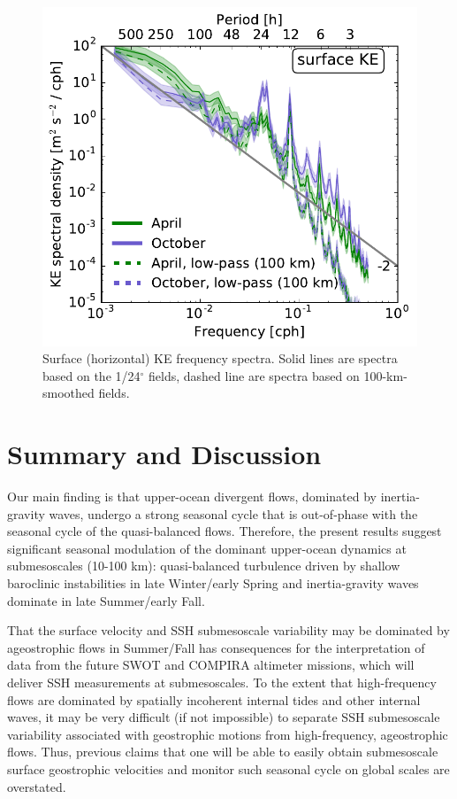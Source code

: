\documentclass[grl]{agutex2015}
\begin{document}
\begin{article}
\begin{figure}[ht]
  \begin{center}
    \includegraphics[width=.45\textwidth]{figs/fig4.pdf}
 \caption{Surface (horizontal) KE frequency spectra. Solid lines
 are spectra based on the 1/24$^\circ$ fields, dashed line are spectra
 based on 100-km-smoothed fields.}
 \label{fig4}
 \end{center}
\end{figure}



\section{Summary and Discussion}
Our main finding is that
upper-ocean divergent flows, dominated by inertia-gravity waves, undergo
a strong seasonal cycle that is out-of-phase with the seasonal cycle of
the quasi-balanced flows. Therefore, the present results suggest significant
seasonal modulation of the dominant upper-ocean dynamics at submesoscales
(10-100 km): quasi-balanced turbulence driven by shallow baroclinic instabilities
in late Winter/early Spring
and inertia-gravity waves dominate in late Summer/early Fall.

That the  surface velocity and SSH submesoscale variability may be
dominated by ageostrophic flows in
Summer/Fall has consequences for the interpretation of data from
the future SWOT and COMPIRA altimeter missions,
which will deliver SSH measurements at submesoscales. To the extent that
high-frequency flows are dominated by spatially incoherent internal tides and other
internal waves, it may be very difficult (if not impossible) to
separate SSH submesoscale variability associated with geostrophic motions
from high-frequency, ageostrophic flows. Thus, previous claims that
one will be able to easily obtain submesoscale surface
geostrophic velocities and monitor such seasonal cycle on global scales
\citep{sasaki_etal2014,qiu_etal2014} are overstated.


\end{article}
\end{document}

